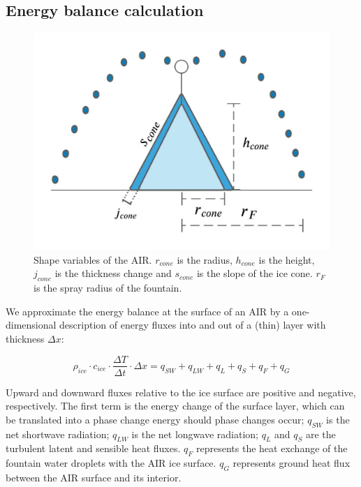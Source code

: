 \documentclass[utf8]{frontiersSCNS}
\begin{document}
\subsection{Energy balance calculation} \label{sec:energy}

\begin{figure}
	\begin{center}
		\includegraphics[width=10 cm]{Figures/Figure_4.jpeg}
	\end{center}
	\caption{Shape variables of the AIR. $r_{cone}$ is the radius, $h_{cone}$ is the height, $j_{cone}$ is the
		thickness change and $s_{cone}$ is the slope of the ice cone. $r_F$ is the spray radius of the fountain.}
	\label{fig:shape}
\end{figure}

We approximate the energy balance at the surface of an AIR by a one-dimensional description of energy fluxes
into and out of a (thin) layer with thickness $\Delta x$:

\begin{equation}
	\rho_{ice} \cdot c_{ice} \cdot \frac{\Delta T}{\Delta t} \cdot \Delta x = q_{SW} + q_{LW} + q_{L} + q_{S} + q_{F} + q_{G}
	\label{eqn:EB}
\end{equation}

Upward and downward fluxes relative to the ice surface are positive and negative, respectively. The first term is
the energy change of the surface layer, which can be translated into a phase change energy should phase changes
occur; $q_{SW}$ is the net shortwave radiation; $q_{LW}$ is the net longwave radiation; $q_{L}$ and $q_{S}$ are
the turbulent latent and sensible heat fluxes. $q_{F}$ represents the heat exchange of the fountain water
droplets with the AIR ice surface. $q_{G}$ represents ground heat flux between the AIR surface and its interior.
\end{document}
